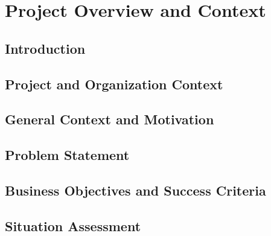 \chapter{Project Overview and Context}
\label{chap:context}

\section{Introduction}

\section{Project and Organization Context}

\section{General Context and Motivation}

\section{Problem Statement}

\section{Business Objectives and Success Criteria}

\section{Situation Assessment}

